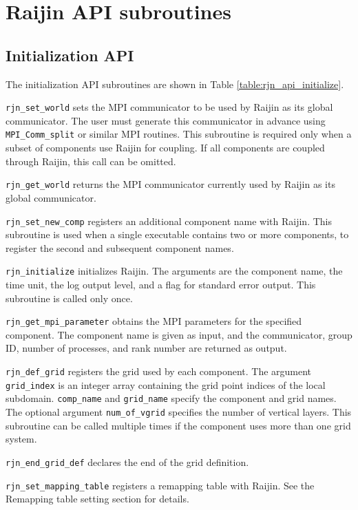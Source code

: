 \documentclass[11pt,a4paper]{report}
\newcommand{\tabref}[1]{Table \ref{#1}}
\begin{document}
\section{Raijin API subroutines}

\subsection{Initialization API}

The initialization API subroutines
are shown in \tabref{table:rjn_api_initialize}.

\texttt{rjn\_set\_world} sets
the MPI communicator to be used by Raijin
as its global communicator.
The user must generate this communicator in advance
using \texttt{MPI\_Comm\_split} or similar MPI routines.
This subroutine is required only when
a subset of components use Raijin for coupling.
If all components are coupled through Raijin,
this call can be omitted.

\texttt{rjn\_get\_world} returns
the MPI communicator currently used by Raijin
as its global communicator.

\texttt{rjn\_set\_new\_comp} registers
an additional component name with Raijin.
This subroutine is used
when a single executable contains two or more components,
to register the second and subsequent component names.

\texttt{rjn\_initialize} initializes Raijin.
The arguments are the component name,
the time unit, the log output level,
and a flag for standard error output.
This subroutine is called only once.

\texttt{rjn\_get\_mpi\_parameter} obtains
the MPI parameters for the specified component.
The component name is given as input,
and the communicator, group ID, number of processes,
and rank number are returned as output.

\texttt{rjn\_def\_grid} registers the grid
used by each component.
The argument \texttt{grid\_index} is an integer array
containing the grid point indices
of the local subdomain.
\texttt{comp\_name} and \texttt{grid\_name}
specify the component and grid names.
The optional argument \texttt{num\_of\_vgrid}
specifies the number of vertical layers.
This subroutine can be called multiple times
if the component uses more than one grid system.

\texttt{rjn\_end\_grid\_def} declares
the end of the grid definition.

\texttt{rjn\_set\_mapping\_table} registers
a remapping table with Raijin.
See the Remapping table setting section for details.
\end{document}
